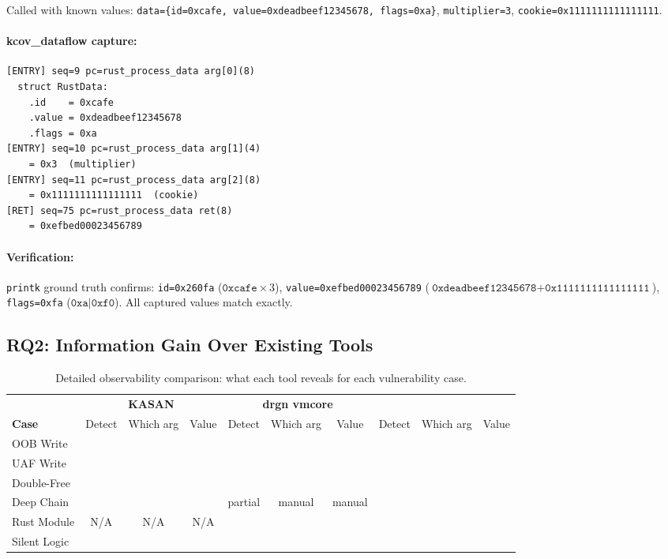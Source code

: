 \documentclass{ndss}
\newcommand{\cmark}{\ding{51}}
\newcommand{\xmark}{\ding{55}}
\begin{document}
Called with known values: \texttt{data=\{id=0xcafe, value=0xdeadbeef12345678,
flags=0xa\}}, \texttt{multiplier=3}, \texttt{cookie=0x1111111111111111}.

\paragraph{kcov\_dataflow capture:}
\begin{lstlisting}[numbers=none]
[ENTRY] seq=9 pc=rust_process_data arg[0](8)
  struct RustData:
    .id    = 0xcafe
    .value = 0xdeadbeef12345678
    .flags = 0xa
[ENTRY] seq=10 pc=rust_process_data arg[1](4)
    = 0x3  (multiplier)
[ENTRY] seq=11 pc=rust_process_data arg[2](8)
    = 0x1111111111111111  (cookie)
[RET] seq=75 pc=rust_process_data ret(8)
    = 0xefbed00023456789
\end{lstlisting}

\paragraph{Verification:} \texttt{printk} ground truth confirms:
\texttt{id=0x260fa} ($\texttt{0xcafe} \times 3$),
\texttt{value=0xefbed00023456789} ($\texttt{0xdeadbeef12345678} +
\texttt{0x1111111111111111}$), \texttt{flags=0xfa} ($\texttt{0xa} |
\texttt{0xf0}$). All captured values match exactly.

\subsection{RQ2: Information Gain Over Existing Tools}\label{sec:rq2}

\begin{table}[t]
\centering
\caption{Detailed observability comparison: what each tool reveals for each vulnerability case.}\label{tab:detailed-gain}
\small
\begin{tabular}{@{}l|ccc|ccc|ccc@{}}
\toprule
& \multicolumn{3}{c|}{\textbf{KASAN}} & \multicolumn{3}{c|}{\textbf{drgn vmcore}} & \multicolumn{3}{c}{\textbf{\toolname{}}} \\
\textbf{Case} & Detect & Which arg & Value & Detect & Which arg & Value & Detect & Which arg & Value \\
\midrule
OOB Write & \cmark & \xmark & \xmark & \cmark & \cmark & \cmark & \cmark & \cmark & \cmark \\
UAF Write & \cmark & \xmark & \xmark & \cmark & \cmark & \cmark & \cmark & \cmark & \cmark \\
Double-Free & \cmark & \xmark & \xmark & \cmark & \cmark & \cmark & \cmark & \cmark & \cmark \\
Deep Chain & \cmark & \xmark & \xmark & partial & manual & manual & \cmark & \cmark & \cmark \\
Rust Module & N/A & N/A & N/A & \xmark & \xmark & \xmark & \cmark & \cmark & \cmark \\
\midrule
Silent Logic & \xmark & \xmark & \xmark & \xmark & \xmark & \xmark & \cmark & \cmark & \cmark \\
\bottomrule
\end{tabular}
\end{table}
\end{document}
